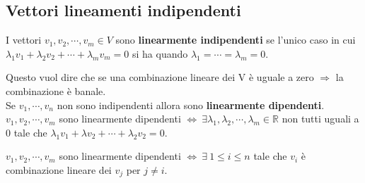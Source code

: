 \newpage
\subsection{Vettori lineamenti indipendenti}
\begin{definition}
I vettori $v_1, v_2, \cdots, v_m \in V$ sono \textbf{linearmente indipendenti} se l'unico caso in cui $\lambda_1 v_1 + \lambda_2 v_2 + \cdots + \lambda_m v_m = 0$ si ha quando $\lambda_1 = \cdots = \lambda_m = 0$.
\end{definition}
\noindent Questo vuol dire che se una combinazione lineare dei V è uguale a zero $\Longrightarrow$ la combinazione è banale.\\
Se $v_1, \cdots, v_n$ non sono indipendenti allora sono \textbf{linearmente dipendenti}.\\
$v_1, v_2, \cdots, v_m$ sono linearmente dipendenti $\Longleftrightarrow \: \exists \lambda_1, \lambda_2, \cdots, \lambda_m \in \mathbb{R}$ non tutti uguali a 0 tale che $\lambda_1 v_1 + \lambda v_2 + \cdots + \lambda_2 v_2 = 0$.

\begin{proposition}
$v_1, v_2, \cdots, v_m$ sono linearmente dipendenti $\Longleftrightarrow \: \exists \: 1 \leq i \leq n$ tale che $v_i$ è combinazione lineare dei $v_j$ per $j\neq i$.
\end{proposition}

